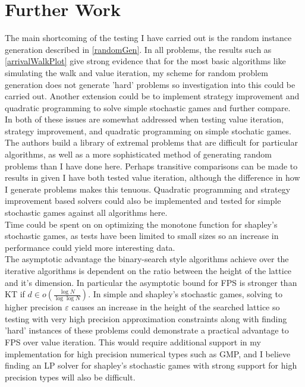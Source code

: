 \section{Further Work}
The main shortcoming of the testing I have carried out is the random instance generation described in \cref{randomGen}.
In all problems, the results such as \cref{arrivalWalkPlot} give strong evidence
that for the most basic algorithms like simulating the walk and value iteration,
my scheme for random problem generation does not generate 'hard' problems so investigation
into this could be carried out. Another extension
could be to implement strategy improvement and quadratic programming
to solve simple stochastic games and further compare.\\
In \citep{valueIterationTest} both of these issues are somewhat addressed when testing value iteration,
strategy improvement, and quadratic programming on simple stochatic games. The authors
build a library of extremal problems that are difficult for particular algorithms, as well as a more
sophisticated method of generating random problems than I have done here. Perhaps transitive
comparisons can be made to results in \citep{valueIterationTest} given
I have both tested value iteration, although the difference in how I generate problems makes this tenuous. 
Quadratic programming and strategy improvement based solvers could also be implemented and tested for simple stochastic games
against all algorithms here. \\
Time could be spent on on optimizing the monotone function for shapley's stochastic games,
as tests have been limited to small sizes so an increase in performance could yield more interesting data. \\
The asymptotic advantage the binary-search style algorithms achieve over the iterative algorithms
is dependent on the ratio between the height of the lattice and it's dimension. In particular
the asymptotic bound for FPS is stronger than KT if $d \in o(\frac{\log N}{\log \log N})$.
In simple and shapley's stochastic games, solving to higher precision $\varepsilon$ causes
an increase in the height of the searched lattice so testing with very high precision
approximation constraints along with finding 'hard' instances of these problems could
demonstrate a practical advantage to FPS over value iteration. This would require additional support
in my implementation for high precision numerical types such as GMP\citep{gmp}, and
I believe finding an LP solver for shapley's stochastic games 
with strong support for high precision types will also be difficult.
